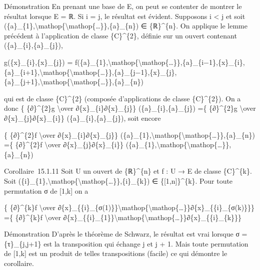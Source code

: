 Démonstration En prenant une base de E, on peut se contenter de montrer
le résultat lorsque E = ℝ. Si i = j, le résultat est évident. Supposons
i \textless{} j et soit
(\{a\}\_\{1\},\textbackslash{}mathop\{\textbackslash{}mathop\{\ldots{}\}\},\{a\}\_\{n\})
∈ \{ℝ\}\^{}\{n\}. On applique le lemme précédent à l'application de
classe \{C\}\^{}\{2\}, définie sur un ouvert contenant
(\{a\}\_\{i\},\{a\}\_\{j\}),

g(\{x\}\_\{i\},\{x\}\_\{j\}) =
f(\{a\}\_\{1\},\textbackslash{}mathop\{\textbackslash{}mathop\{\ldots{}\}\},\{a\}\_\{i−1\},\{x\}\_\{i\},\{a\}\_\{i+1\},\textbackslash{}mathop\{\textbackslash{}mathop\{\ldots{}\}\},\{a\}\_\{j−1\},\{x\}\_\{j\},\{a\}\_\{j+1\},\textbackslash{}mathop\{\textbackslash{}mathop\{\ldots{}\}\},\{a\}\_\{n\})

qui est de classe \{C\}\^{}\{2\} (composée d'applications de classe
\{C\}\^{}\{2\}). On a donc \{ \{∂\}\^{}\{2\}g \textbackslash{}over
∂\{x\}\_\{i\}∂\{x\}\_\{j\}\} (\{a\}\_\{i\},\{a\}\_\{j\}) =\{
\{∂\}\^{}\{2\}g \textbackslash{}over ∂\{x\}\_\{j\}∂\{x\}\_\{i\}\}
(\{a\}\_\{i\},\{a\}\_\{j\}), soit encore

\{ \{∂\}\^{}\{2\}f \textbackslash{}over ∂\{x\}\_\{i\}∂\{x\}\_\{j\}\}
(\{a\}\_\{1\},\textbackslash{}mathop\{\textbackslash{}mathop\{\ldots{}\}\},\{a\}\_\{n\})
=\{ \{∂\}\^{}\{2\}f \textbackslash{}over ∂\{x\}\_\{j\}∂\{x\}\_\{i\}\}
(\{a\}\_\{1\},\textbackslash{}mathop\{\textbackslash{}mathop\{\ldots{}\}\},\{a\}\_\{n\})

Corollaire~15.1.11 Soit U un ouvert de \{ℝ\}\^{}\{n\} et f : U → E de
classe \{C\}\^{}\{k\}. Soit
(\{i\}\_\{1\},\textbackslash{}mathop\{\textbackslash{}mathop\{\ldots{}\}\},\{i\}\_\{k\})
∈ \{{[}1,n{]}\}\^{}\{k\}. Pour toute permutation σ de {[}1,k{]} on a

\{ \{∂\}\^{}\{k\}f \textbackslash{}over
∂\{x\}\_\{\{i\}\_\{σ(1)\}\}\textbackslash{}mathop\{\textbackslash{}mathop\{\ldots{}\}\}∂\{x\}\_\{\{i\}\_\{σ(k)\}\}\}
=\{ \{∂\}\^{}\{k\}f \textbackslash{}over
∂\{x\}\_\{\{i\}\_\{1\}\}\textbackslash{}mathop\{\textbackslash{}mathop\{\ldots{}\}\}∂\{x\}\_\{\{i\}\_\{k\}\}\}

Démonstration D'après le théorème de Schwarz, le résultat est vrai
lorsque σ = \{τ\}\_\{j,j+1\} est la transposition qui échange j et j +
1. Mais toute permutation de {[}1,k{]} est un produit de telles
transpositions (facile) ce qui démontre le corollaire.

